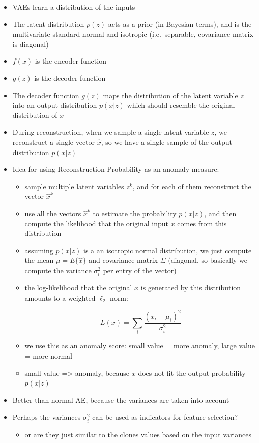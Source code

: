 \documentclass[
  letterpaper,
  DIV=11,
  numbers=noendperiod]{scrartcl}
\providecommand{\tightlist}{%
  \setlength{\itemsep}{0pt}\setlength{\parskip}{0pt}}
\begin{document}
\begin{itemize}
\item
  VAEs learn a distribution of the inputs
\item
  The latent distribution \(p(z)\) acts as a prior (in Bayesian terms),
  and is the multivariate standard normal and isotropic (i.e.~separable,
  covariance matrix is diagonal)
\item
  \(f(x)\) is the encoder function
\item
  \(g(z)\) is the decoder function
\item
  The decoder function \(g(z)\) maps the distribution of the latent
  variable \(z\) into an output distribution \(p(x|z)\) which should
  resemble the original distribution of \(x\)
\item
  During reconstruction, when we sample a single latent variable \(z\),
  we reconstruct a single vector \(\hat{x}\), so we have a single sample
  of the output distribution \(p(x|z)\)
\item
  Idea for using Reconstruction Probability as an anomaly measure:

  \begin{itemize}
  \item
    sample multiple latent variables \(z^k\), and for each of them
    reconstruct the vector \(\hat{x}^k\)
  \item
    use all the vectors \(\hat{x}^k\) to estimate the probability
    \(p(x|z)\), and then compute the likelihood that the original input
    \(x\) comes from this distribution
  \item
    assuming \(p(x|z)\) is a an isotropic normal distribution, we just
    compute the mean \(\mu = E \lbrace \hat{x} \rbrace\) and covariance
    matrix \(\Sigma\) (diagonal, so basically we compute the variance
    \(\sigma_i^2\) per entry of the vector)
  \item
    the log-likelihood that the original \(x\) is generated by this
    distribution amounts to a weighted \(\ell_2\) norm:

    \[L(x) = \sum_i \frac{(x_i - \mu_i)^2}{\sigma_i^2}\]
  \item
    we use this as an anomaly score: small value = more anomaly, large
    value = more normal
  \item
    small value =\textgreater{} anomaly, because \(x\) does not fit the
    output probability \(p(x|z)\)
  \end{itemize}
\item
  Better than normal AE, because the variances are taken into account
\item
  Perhaps the variances \(\sigma_i^2\) can be used as indicators for
  feature selection?

  \begin{itemize}
  \tightlist
  \item
    or are they just similar to the clones values based on the input
    variances
  \end{itemize}
\end{itemize}
\end{document}
